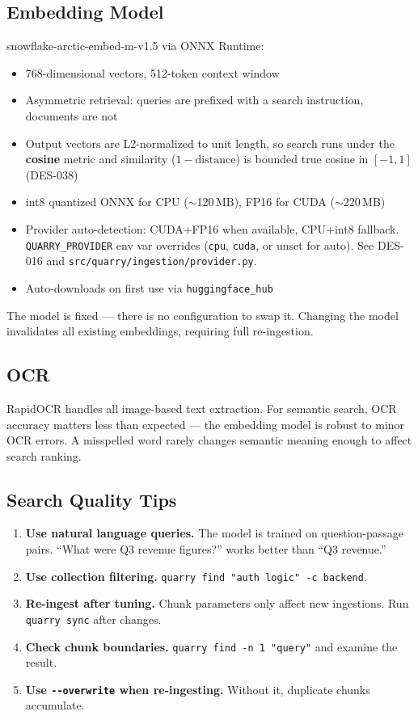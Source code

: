 \documentclass[a4paper,10pt]{article}
\newcommand{\modpath}[1]{\texttt{src/quarry/#1}}
\begin{document}
\subsection{Embedding Model}

snowflake-arctic-embed-m-v1.5 via ONNX Runtime:

\begin{itemize}
  \item 768-dimensional vectors, 512-token context window
  \item Asymmetric retrieval: queries are prefixed with a search
    instruction, documents are not
  \item Output vectors are L2-normalized to unit length, so search runs
    under the \textbf{cosine} metric and similarity
    ($1 - \text{distance}$) is bounded true cosine in $[-1, 1]$
    (DES-038)
  \item int8 quantized ONNX for CPU ($\sim$120\,MB), FP16 for CUDA
    ($\sim$220\,MB)
  \item Provider auto-detection: CUDA+FP16 when available, CPU+int8
    fallback.  \texttt{QUARRY\_PROVIDER} env var overrides
    (\texttt{cpu}, \texttt{cuda}, or unset for auto).
    See DES-016 and \modpath{ingestion/provider.py}.
  \item Auto-downloads on first use via \texttt{huggingface\_hub}
\end{itemize}

The model is fixed --- there is no configuration to swap it.  Changing
the model invalidates all existing embeddings, requiring full
re-ingestion.

\subsection{OCR}

RapidOCR handles all image-based text extraction.  For semantic
search, OCR accuracy matters less than expected --- the embedding
model is robust to minor OCR errors.  A misspelled word rarely
changes semantic meaning enough to affect search ranking.

\subsection{Search Quality Tips}

\begin{enumerate}
  \item \textbf{Use natural language queries.}  The model is trained on
    question-passage pairs.  ``What were Q3 revenue figures?'' works
    better than ``Q3 revenue.''
  \item \textbf{Use collection filtering.}
    \texttt{quarry find "auth logic" -c backend}.
  \item \textbf{Re-ingest after tuning.}  Chunk parameters only affect
    new ingestions.  Run \texttt{quarry sync} after changes.
  \item \textbf{Check chunk boundaries.}
    \texttt{quarry find -n 1 "query"} and examine the result.
  \item \textbf{Use \texttt{-{}-overwrite} when re-ingesting.}
    Without it, duplicate chunks accumulate.
\end{enumerate}
\end{document}
